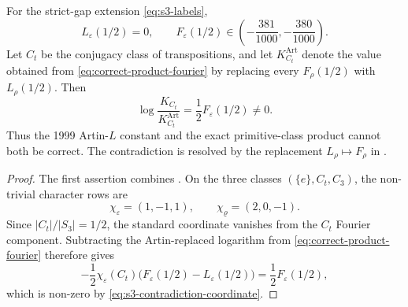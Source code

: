 \begin{theorem}
\label{thm:s3-contradiction}
For the strict-gap extension \eqref{eq:s3-labels},
\begin{equation}\label{eq:s3-contradiction-coordinate}
  L_\varepsilon(1/2)=0,
  \qquad
  F_\varepsilon(1/2)\in
     \left(-\frac{381}{1000},-\frac{380}{1000}\right).
\end{equation}
Let \(C_t\) be the conjugacy class of transpositions, and let
\(K_{C_t}^{\mathrm{Art}}\) denote the value obtained from
\eqref{eq:correct-product-fourier} by replacing every \(F_\rho(1/2)\) with
\(L_\rho(1/2)\).  Then
\begin{equation}\label{eq:s3-class-contradiction}
  \log\frac{K_{C_t}}{K_{C_t}^{\mathrm{Art}}}
  =\frac12F_\varepsilon(1/2)\ne 0.
\end{equation}
Thus the 1999 Artin-\(L\) constant and the exact primitive-class product
cannot both be correct.  The contradiction is resolved by the replacement
\(L_\rho\mapsto F_\rho\) in .
\end{theorem}

\begin{proof}
The first assertion combines .
On the three classes \((\{e\},C_t,C_3)\), the non-trivial character rows are
\[
  \chi_\varepsilon=(1,-1,1),
  \qquad \chi_\varrho=(2,0,-1).
\]
Since \(|C_t|/|S_3|=1/2\), the standard coordinate vanishes from the
\(C_t\) Fourier component.  Subtracting the Artin-replaced logarithm from
\eqref{eq:correct-product-fourier} therefore gives
\[
  -\frac12\chi_\varepsilon(C_t)
    \bigl(F_\varepsilon(1/2)-L_\varepsilon(1/2)\bigr)
  =\frac12F_\varepsilon(1/2),
\]
which is non-zero by \eqref{eq:s3-contradiction-coordinate}.
\end{proof}
